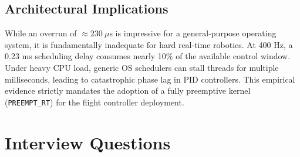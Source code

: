 \documentclass{article}
\begin{document}
\subsection{Architectural Implications}
While an overrun of $\approx 230\ \mu$s is impressive for a general-purpose operating system, it is fundamentally inadequate for hard real-time robotics. At 400 Hz, a 0.23 ms scheduling delay consumes nearly 10\% of the available control window. Under heavy CPU load, generic OS schedulers can stall threads for multiple milliseconds, leading to catastrophic phase lag in PID controllers. This empirical evidence strictly mandates the adoption of a fully preemptive kernel (\texttt{PREEMPT\_RT}) for the flight controller deployment.
\section{Interview Questions}
\end{document}
